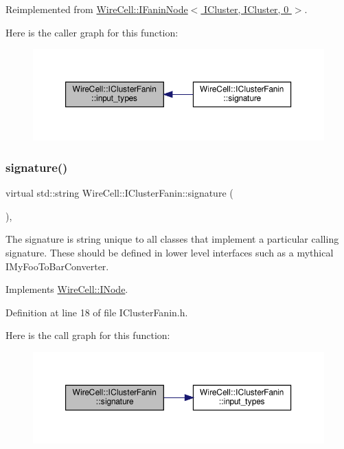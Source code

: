 Reimplemented from \hyperlink{class_wire_cell_1_1_i_fanin_node_a102c43a647e2e0070e329c397e27c2f5}{Wire\+Cell\+::\+I\+Fanin\+Node$<$ I\+Cluster, I\+Cluster, 0 $>$}.

Here is the caller graph for this function\+:
\nopagebreak
\begin{figure}[H]
\begin{center}
\leavevmode
\includegraphics[width=350pt]{class_wire_cell_1_1_i_cluster_fanin_a4021793d08233b3cb10f788d20d313c2_icgraph}
\end{center}
\end{figure}
\mbox{\label{class_wire_cell_1_1_i_cluster_fanin_ab6830dadbc5f673427ccaef1b4521023}} 
\subsubsection{\texorpdfstring{signature()}{signature()}}
{\footnotesize\ttfamily virtual std\+::string Wire\+Cell\+::\+I\+Cluster\+Fanin\+::signature (\begin{DoxyParamCaption}{ }\end{DoxyParamCaption})\hspace{0.3cm}{\ttfamily [inline]}, {\ttfamily [virtual]}}

The signature is string unique to all classes that implement a particular calling signature. These should be defined in lower level interfaces such as a mythical I\+My\+Foo\+To\+Bar\+Converter. 

Implements \hyperlink{class_wire_cell_1_1_i_node_a0b0763465adf5ba7febe8e378162b584}{Wire\+Cell\+::\+I\+Node}.



Definition at line 18 of file I\+Cluster\+Fanin.\+h.

Here is the call graph for this function\+:
\nopagebreak
\begin{figure}[H]
\begin{center}
\leavevmode
\includegraphics[width=350pt]{class_wire_cell_1_1_i_cluster_fanin_ab6830dadbc5f673427ccaef1b4521023_cgraph}
\end{center}
\end{figure}


